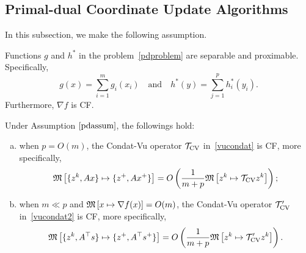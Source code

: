 {{\subsection{Primal-dual Coordinate Update Algorithms}\label{sec:pdcu}
In this subsection, we make the following assumption.
\begin{assumption}
Functions $g$ and $h^*$ in the problem~\eqref{pdproblem} are separable and proximable. Specifically, $$g(x)=\displaystyle\sum_{i=1} ^m g_i(x_i)\quad\mbox{and}\quad h^*(y)=\displaystyle\sum_{j=1}^ph^*_i(y_i).$$\label{pdassum}
Furthermore, $\nabla f$ is CF.
\end{assumption}
\begin{proposition}\DIFaddbegin \label{prop1}
\DIFaddend Under Assumption $\ref{pdassum}$, the followings hold:
\begin{enumerate}[(a)]
\item when $p=O(m)$, the Condat-Vu operator ${{\mathcal{T}}_{\textnormal{CV}}}$ in~\eqref{vucondat} is CF, more specifically, $$\mathfrak{M}\left[{\{z^k,Ax\}}\mapsto {\{z^+,Ax^+\}}\right]=O\left(\frac{1}{m+p}\mathfrak{M}\left[{z^k}\mapsto {{{\mathcal{T}}_{\textnormal{CV}}}z^k}\right]\right);$$
\item when $m\ll p$ and $\mathfrak{M}\left[{x}\mapsto {\nabla f(x)}\right]=O(m)$, the Condat-Vu operator ${\mathcal{T}}'_\textnormal{CV}$ in~\eqref{vucondat2} is CF, more specifically, $$\mathfrak{M}\left[{\{z^k,A^\top s\}}\mapsto {\{z^+,A^\top s^+\}}\right]=O\left(\frac{1}{m+p}\mathfrak{M}\left[{z^k}\mapsto {{\mathcal{T}}'_{\textnormal{CV}} z^k}\right]\right).$$
\end{enumerate}
\end{proposition}

}}
